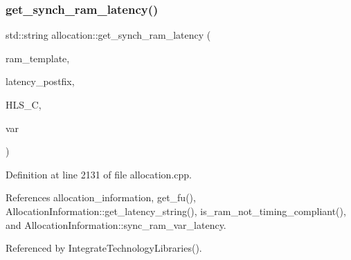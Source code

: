 \mbox{\label{classallocation_acef7ab9b504f496fa9367192c5edca22}} 
\subsubsection{\texorpdfstring{get\+\_\+synch\+\_\+ram\+\_\+latency()}{get\_synch\_ram\_latency()}}
{\footnotesize\ttfamily std\+::string allocation\+::get\+\_\+synch\+\_\+ram\+\_\+latency (\begin{DoxyParamCaption}\item[{const std\+::string \&}]{ram\+\_\+template,  }\item[{const std\+::string \&}]{latency\+\_\+postfix,  }\item[{const \hyperlink{hls__constraints_8hpp_ac394d1c5cd991614133724294a79182b}{H\+L\+S\+\_\+constraints\+Ref}}]{H\+L\+S\+\_\+C,  }\item[{unsigned int}]{var }\end{DoxyParamCaption})\hspace{0.3cm}{\ttfamily [protected]}}



Definition at line 2131 of file allocation.\+cpp.



References allocation\+\_\+information, get\+\_\+fu(), Allocation\+Information\+::get\+\_\+latency\+\_\+string(), is\+\_\+ram\+\_\+not\+\_\+timing\+\_\+compliant(), and Allocation\+Information\+::sync\+\_\+ram\+\_\+var\+\_\+latency.



Referenced by Integrate\+Technology\+Libraries().


